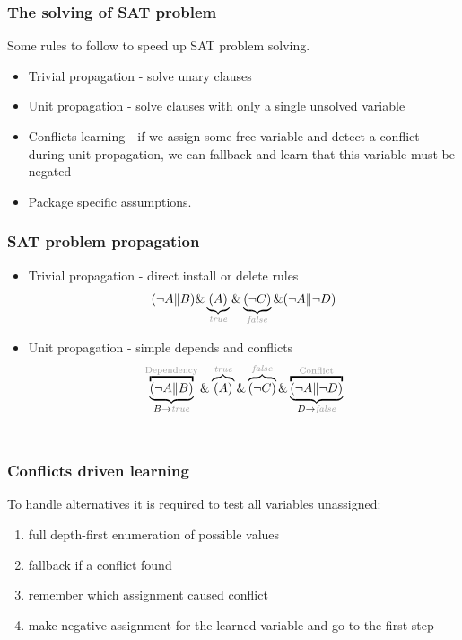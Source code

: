 \documentclass{beamer}
\begin{document}
\begin{frame}
\frametitle{The solving of SAT problem}

Some rules to follow to speed up SAT problem solving.
\begin{itemize}
  \item Trivial propagation - solve unary clauses
  \item Unit propagation - solve clauses with only a single unsolved variable
  \item Conflicts learning - if we assign some free variable and detect a
  conflict during unit propagation, we can fallback and learn that this variable
  must be negated
  \item Package specific assumptions.
\end{itemize}
\end{frame}

\begin{frame}
\frametitle{SAT problem propagation}
\begin{itemize}
  \item Trivial propagation - direct install or delete rules
  \bigskip
  \[
  (\neg A \| B) \& \underbrace{(A)}_{\textit{\color{light-gray}true}} \&
  \underbrace{(\neg C)}_{\textit{\color{light-gray}false}} \& (\neg A \| \neg D)
  \]
  \pause
  \item Unit propagation - simple depends and conflicts
  \bigskip
  \[
  \overbracket{\underbrace{(\neg A \| B)}_{B \rightarrow
  \textit{\color{light-gray}true}}}^{\text{\color{light-gray}Dependency}} \&
  \overbrace{(A)}^{\textit{\color{light-gray}true}} \& \overbrace{(\neg
  C)}^{\textit{\color{light-gray}false}} \&
  \overbracket{\underbrace{(\neg A \| \neg D)}_{D \rightarrow
  \textit{\color{light-gray}false}}}^{\text{\color{light-gray}Conflict}}
  \]
  \
\end{itemize}
\end{frame}

\begin{frame}
\frametitle{Conflicts driven learning}
To handle alternatives it is required to test all variables unassigned:
\begin{enumerate}
  \item full depth-first enumeration of possible values
  \item fallback if a conflict found
  \item remember which assignment caused conflict
  \item make negative assignment for the learned variable and go to the first
  step
\end{enumerate}
\end{frame}
\end{document}
